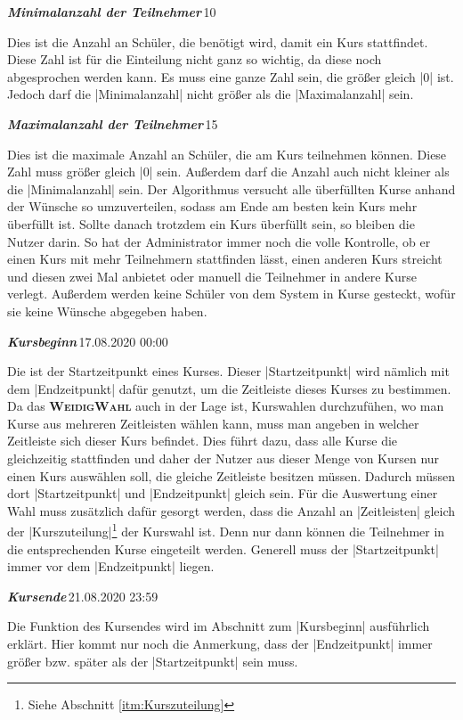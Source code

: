 \documentclass[ngerman]{ltxdoc}
\newcommand{\DescribeOption}[4]{
  \DescribeMacro{#1}
  \begin{minipage}[t]{\textwidth}
    \textit{\textbf{\textcolor{mLightGreen}{#2}}}\dotfill\,#3\par
    \begingroup
    \vspace{0.5em}#4\par
    \endgroup
  \end{minipage}
}
\newcommand{\name}{\textbf{\textsc{WeidigWahl}}\xspace}
\begin{document}
\DescribeOption{Minimum}{Minimalanzahl der Teilnehmer}{10}{
  Dies ist die Anzahl an Schüler, die benötigt wird, damit ein Kurs stattfindet.
  Diese Zahl ist für die Einteilung nicht ganz so wichtig, da diese noch abgesprochen
  werden kann. Es muss eine ganze Zahl sein, die größer gleich |0| ist. Jedoch darf die
  |Minimalanzahl| nicht größer als die |Maximalanzahl| sein.
}

\DescribeOption{Maximum}{Maximalanzahl der Teilnehmer}{15}{
  Dies ist die maximale Anzahl an Schüler, die am Kurs teilnehmen können. Diese Zahl
  muss größer gleich |0| sein. Außerdem darf die Anzahl auch nicht kleiner als
  die |Minimalanzahl| sein. Der Algorithmus versucht alle überfüllten Kurse
  anhand der Wünsche so umzuverteilen, sodass am Ende am besten kein Kurs mehr
  überfüllt ist. Sollte danach trotzdem ein Kurs überfüllt sein, so bleiben die
  Nutzer darin. So hat der Administrator immer noch die volle Kontrolle, ob er
  einen Kurs mit mehr Teilnehmern stattfinden lässt, einen anderen Kurs streicht
  und diesen zwei Mal anbietet oder manuell die Teilnehmer in andere Kurse verlegt.
  Außerdem werden keine Schüler von dem System in Kurse gesteckt, wofür sie keine
  Wünsche abgegeben haben.
}

\DescribeOption{Beginn}{Kursbeginn}{17.08.2020 00:00}{
 Die ist der Startzeitpunkt eines Kurses. Dieser |Startzeitpunkt| wird nämlich
 mit dem |Endzeitpunkt| dafür genutzt, um die Zeitleiste dieses Kurses zu bestimmen.
 Da das \name auch in der Lage ist, Kurswahlen durchzufühen, wo man Kurse aus mehreren
 Zeitleisten wählen kann, muss man angeben in welcher Zeitleiste sich dieser Kurs
 befindet. Dies führt dazu, dass alle Kurse die gleichzeitig stattfinden und daher
 der Nutzer aus dieser Menge von Kursen nur einen Kurs auswählen soll, die gleiche
 Zeitleiste besitzen müssen. Dadurch müssen dort |Startzeitpunkt| und |Endzeitpunkt|
 gleich sein. Für die Auswertung einer Wahl muss zusätzlich dafür gesorgt werden,
 dass die Anzahl an |Zeitleisten| gleich der |Kurszuteilung|\footnote{Siehe Abschnitt \ref{itm:Kurszuteilung}}
 der Kurswahl ist. Denn nur dann können die Teilnehmer in die entsprechenden
 Kurse eingeteilt werden. Generell muss der |Startzeitpunkt| immer vor dem |Endzeitpunkt|
 liegen.
}

\DescribeOption{Ende}{Kursende}{21.08.2020 23:59}{
Die Funktion des Kursendes wird im Abschnitt zum |Kursbeginn| ausführlich erklärt.
Hier kommt nur noch die Anmerkung, dass der |Endzeitpunkt| immer größer bzw. später
als der |Startzeitpunkt| sein muss.
}
\end{document}
